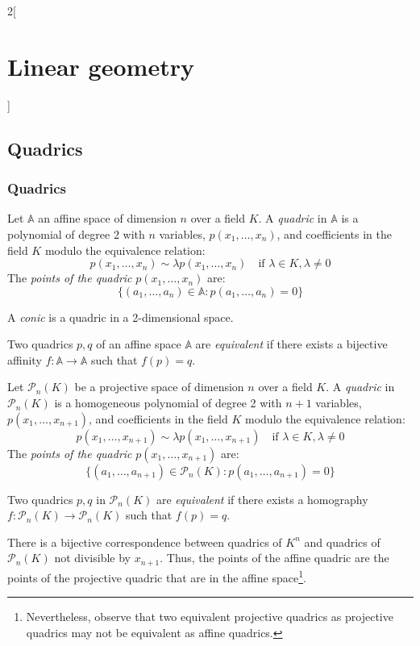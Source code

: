 \documentclass[../../../main.tex]{subfiles}
\begin{document}
\begin{multicols}{2}[\section{Linear geometry}]
  \subsection{Quadrics}
  \subsubsection{Quadrics}
  \begin{definition}
    Let $\mathbb{A}$ an affine space of dimension $n$ over a field $K$. A \emph{quadric} in $\mathbb{A}$ is a polynomial of degree 2 with $n$ variables, $p(x_1,\ldots,x_n)$, and coefficients in the field $K$ modulo the equivalence relation: $$p(x_1,\ldots,x_n)\sim\lambda p(x_1,\ldots,x_n)\quad\text{if }\lambda\in K,\lambda\ne0$$ The \emph{points of the quadric} $p(x_1,\ldots,x_n)$ are: $$\{(a_1,\ldots,a_n)\in\mathbb{A}:p(a_1,\ldots,a_n)=0\}$$
  \end{definition}
  \begin{definition}
    A \emph{conic} is a quadric in a 2-dimensional space.
  \end{definition}
  \begin{definition}
    Two quadrics $p,q$ of an affine space $\mathbb{A}$ are \emph{equivalent} if there exists a bijective affinity $f:\mathbb{A}\rightarrow\mathbb{A}$ such that $f(p)=q$.
  \end{definition}
  \begin{definition}
    Let $\mathcal{P}_n(K)$ be a projective space of dimension $n$ over a field $K$. A \emph{quadric} in $\mathcal{P}_n(K)$ is a homogeneous polynomial of degree 2 with $n+1$ variables, $p(x_1,\ldots,x_{n+1})$, and coefficients in the field $K$ modulo the equivalence relation: $$p(x_1,\ldots,x_{n+1})\sim\lambda p(x_1,\ldots,x_{n+1})\quad\text{if }\lambda\in K,\lambda\ne0$$ The \emph{points of the quadric} $p(x_1,\ldots,x_{n+1})$ are: $$\{(a_1,\ldots,a_{n+1})\in\mathcal{P}_n(K):p(a_1,\ldots,a_{n+1})=0\}$$
  \end{definition}
  \begin{definition}
    Two quadrics $p,q$ in $\mathcal{P}_n(K)$ are \emph{equivalent} if there exists a homography $f:\mathcal{P}_n(K)\rightarrow\mathcal{P}_n(K)$ such that $f(p)=q$.
  \end{definition}
  \begin{theorem}
    There is a bijective correspondence between quadrics of $K^n$ and quadrics of $\mathcal{P}_n(K)$ not divisible by $x_{n+1}$. Thus, the points of the affine quadric are the points of the projective quadric that are in the affine space\footnote{Nevertheless, observe that two equivalent projective quadrics as projective quadrics may not be equivalent as affine quadrics.}.

\end{theorem}
\end{multicols}
\end{document}
